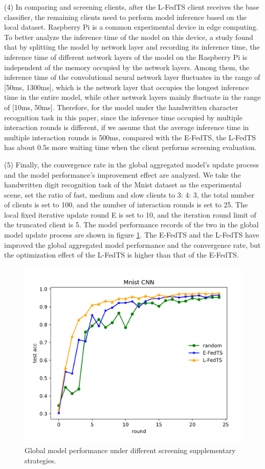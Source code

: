 \documentclass{article}
\begin{document}
(4) In comparing and screening clients, after the L-FedTS client receives the base classifier, the remaining clients need to perform model inference based on the local dataset. Raspberry Pi is a common experimental device in edge computing. To better analyze the inference time of the model on this device, a study \cite{zhang2021adaptive} found that by splitting the model by network layer and recording its inference time, the inference time of different network layers of the model on the Raspberry Pi is independent of the memory occupied by the network layers. Among them, the inference time of the convolutional neural network layer fluctuates in the range of [50ms, 1300ms], which is the network layer that occupies the longest inference time in the entire model, while other network layers mainly fluctuate in the range of [10ms, 50ms]. Therefore, for the model under the handwritten character recognition task in this paper, since the inference time occupied by multiple interaction rounds is different, if we assume that the average inference time in multiple interaction rounds is 500ms, compared with the E-FedTS, the L-FedTS has about 0.5s more waiting time when the client performs screening evaluation.

(5) Finally, the convergence rate in the global aggregated model’s update process and the model performance’s improvement effect are analyzed. We take the handwritten digit recognition task of the Mnist dataset as the experimental scene, set the ratio of fast, medium and slow clients to 3: 4: 3, the total number of clients is set to 100, and the number of interaction rounds is set to 25. The local fixed iterative update round E is set to 10, and the iteration round limit of the truncated client is 5. The model performance records of the two in the global model update process are shown in figure \ref{fig12}. The E-FedTS and the L-FedTS have improved the global aggregated model performance and the convergence rate, but the optimization effect of the L-FedTS is higher than that of the E-FedTS. 

\begin{figure}[!htbp]
\vspace{-0.4cm} 
	\centering
	\includegraphics[width=0.6\linewidth]{fig12.png}
	\caption{Global model performance under different screening supplementary strategies.}
	\label{fig12}
\end{figure}
\end{document}
